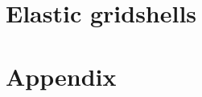 %
%
%




\graphicspath{{./ch4_energy/img/}{./ch3_geometry/img/}}



\frontmatter



%
%

\setcounter{page}{0}

\setcounter{tocdepth}{2}
\tableofcontents

\setlength{\parskip}{1em}

\mainmatter

\part{Elastic gridshells}



%
%
%
%

\part{Appendix}


\backmatter


